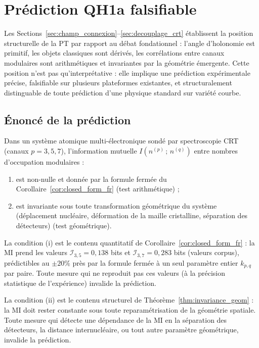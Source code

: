 \section{Prédiction QH1a falsifiable}
\label{sec:prediction_qh1a}

Les Sections~\ref{sec:champ_connexion}--\ref{sec:decouplage_crt}
établissent la position structurelle de la PT par rapport au
débat fondationnel : l'angle d'holonomie est primitif, les
objets classiques sont dérivés, les corrélations entre canaux
modulaires sont arithmétiques et invariantes par la géométrie
émergente. Cette position n'est pas qu'interprétative : elle
implique une prédiction expérimentale précise, falsifiable sur
plusieurs plateformes existantes, et structuralement
distinguable de toute prédiction d'une physique standard sur
variété courbe.

\subsection{Énoncé de la prédiction}
\label{ssec:qh1a_enonce}

\begin{prediction}
\label{pred:qh1a}
Dans un système atomique multi-électronique sondé par
spectroscopie CRT (canaux $p = 3, 5, 7$), l'information mutuelle
$I(n^{(p)}\,;\,n^{(q)})$ entre nombres d'occupation modulaires :
\begin{enumerate}[label=(\roman*),nosep]
  \item est non-nulle et donnée par la formule fermée du
  Corollaire~\ref{cor:closed_form_fr} (test arithmétique) ;
  \item est invariante sous toute transformation géométrique
  du système (déplacement nucléaire, déformation de la maille
  cristalline, séparation des détecteurs) (test géométrique).
\end{enumerate}
\end{prediction}

La condition (i) est le contenu quantitatif de
Corollaire~\ref{cor:closed_form_fr} : la MI prend les valeurs
$\mathcal{I}_{3,5} = 0{,}138$ bits et
$\mathcal{I}_{3,7} = 0{,}283$ bits (valeurs corpus), prédictibles
au $\pm 20\%$ près par la formule fermée à un seul paramètre
entier $k_{p,q}$ par paire. Toute mesure qui ne reproduit pas ces
valeurs (à la précision statistique de l'expérience) invalide la
prédiction.

La condition (ii) est le contenu structurel de
Théorème~\ref{thm:invariance_geom} : la MI doit rester constante
sous toute reparamétrisation de la géométrie spatiale. Toute
mesure qui détecte une dépendance de la MI en la séparation des
détecteurs, la distance internucléaire, ou tout autre paramètre
géométrique, invalide la prédiction.

